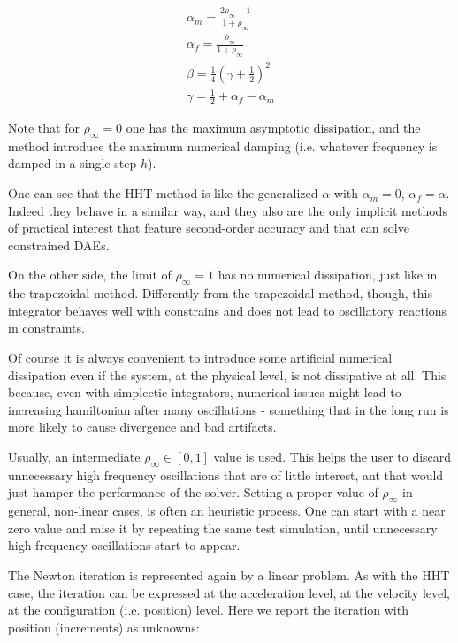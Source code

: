 \documentclass{digitaldynamics}
\begin{document}
\begin{align}
\alpha_m = \frac{2 \rho_\infty - 1}{1+ \rho_\infty} 
\\
\alpha_f = \frac{\rho_\infty}{1+ \rho_\infty} 
\\
\beta = \frac{1}{4} \left(\gamma + \frac{1}{2} \right)^2
\\
\gamma =\frac{1}{2} + \alpha_f - \alpha_m
\end{align}

Note that for $\rho_\infty = 0$ one has the maximum asymptotic dissipation, 
and the method introduce the maximum numerical damping (i.e. whatever frequency is 
damped in a single step $h$). 

One can see that the HHT method is like the generalized-$\alpha$ with $\alpha_m=0$, $\alpha_f=\alpha$. Indeed they behave in a similar way, and they also are the only implicit methods of practical interest that feature second-order accuracy and that can solve constrained DAEs.

On the other side, the limit of $\rho_\infty = 1$ has no numerical dissipation,
just like in the trapezoidal method. Differently from the trapezoidal method, though, this 
integrator behaves well with constrains and does not lead to oscillatory reactions in constraints.

Of course it is always convenient to introduce some artificial numerical dissipation even if the system, at the physical level, is not dissipative at all. This because, even with simplectic integrators, numerical issues might lead to increasing hamiltonian after many oscillations - something that in the long run is more likely to cause divergence and bad artifacts.

Usually, an intermediate $\rho_\infty \in [0,1]$ value is used. This helps the user to discard unnecessary high frequency oscillations that are of little interest, ant that would just hamper the performance of the solver. Setting a proper value of $\rho_\infty$ in general, non-linear cases, is often an heuristic process. One can start with a near zero value and raise it by repeating the same  test simulation, until unnecessary high frequency oscillations start to appear.
 
The Newton iteration is represented again by a linear problem. As with the HHT case, the iteration can be expressed at the acceleration level, at the velocity level, at the configuration (i.e. position) level. Here we report the iteration with position (increments) as unknowns:
\end{document}
